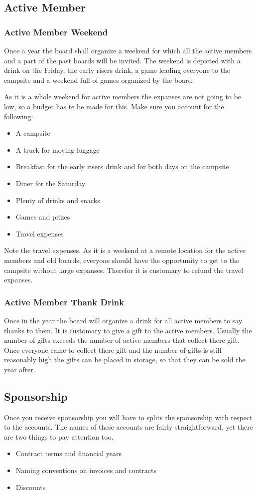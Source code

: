 \documentclass{report}
\begin{document}
\subsection{Active Member}
\subsubsection{Active Member Weekend}
Once a year the board shall organize a weekend for which all the active members and a part of the past boards will be invited. The weekend is depicted with a drink on the Friday, the early risers drink, a game leading everyone to the campsite and a weekend full of games organized by the board. 

As it is a whole weekend for active members the expanses are not going to be low, so a budget has te be made for this. Make sure you account for the following:
\begin{itemize}
	\item A campsite
	\item A truck for moving luggage
	\item Breakfast for the early risers drink and for both days on the campsite
	\item Diner for the Saturday
	\item Plenty of drinks and snacks
	\item Games and prizes
	\item Travel expenses 
\end{itemize}
Note the travel expenses. As it is a weekend at a remote location for the active members and old boards, everyone should have the opportunity to get to the campsite without large expanses. Therefor it is customary to refund the travel expanses.
 
\subsubsection{Active Member Thank Drink}
Once in the year the board will organize a drink for all active members to say thanks to them. It is customary to give a gift to the active members. Usually the number of gifts exceeds the number of active members that collect there gift. Once everyone came to collect there gift and the number of gifts is still reasonably high the gifts can be placed in storage, so that they can be sold the year after. 
\subsection{Sponsorship}
Once you receive sponsorship you will have to splits the sponsorship with respect to the accounts. The names of these accounts are fairly straightforward, yet there are two things to pay attention too.
\begin{itemize}
	\item Contract terms and financial years
	\item Naming conventions on invoices and contracts
	\item Discounts
\end{itemize}
\end{document}
